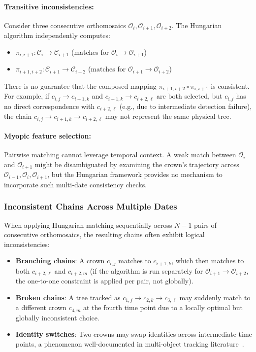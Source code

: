 \paragraph{Transitive inconsistencies:} Consider three consecutive orthomosaics $\mathcal{O}_i, \mathcal{O}_{i+1}, \mathcal{O}_{i+2}$. The Hungarian algorithm independently computes:
\begin{itemize}
    \item $\pi_{i,i+1}: \mathcal{C}_i \to \mathcal{C}_{i+1}$ (matches for $\mathcal{O}_i \to \mathcal{O}_{i+1}$)
    \item $\pi_{i+1,i+2}: \mathcal{C}_{i+1} \to \mathcal{C}_{i+2}$ (matches for $\mathcal{O}_{i+1} \to \mathcal{O}_{i+2}$)
\end{itemize}
There is no guarantee that the composed mapping $\pi_{i+1,i+2} \circ \pi_{i,i+1}$ is consistent. For example, if $c_{i,j} \to c_{i+1,k}$ and $c_{i+1,k} \to c_{i+2,\ell}$ are both selected, but $c_{i,j}$ has no direct correspondence with $c_{i+2,\ell}$ (e.g., due to intermediate detection failure), the chain $c_{i,j} \to c_{i+1,k} \to c_{i+2,\ell}$ may not represent the same physical tree.

\paragraph{Myopic feature selection:} Pairwise matching cannot leverage temporal context. A weak match between $\mathcal{O}_i$ and $\mathcal{O}_{i+1}$ might be disambiguated by examining the crown's trajectory across $\mathcal{O}_{i-1}, \mathcal{O}_i, \mathcal{O}_{i+1}$, but the Hungarian framework provides no mechanism to incorporate such multi-date consistency checks.

\subsubsection{Inconsistent Chains Across Multiple Dates}

When applying Hungarian matching sequentially across $N-1$ pairs of consecutive orthomosaics, the resulting chains often exhibit logical inconsistencies:
\begin{itemize}
    \item \textbf{Branching chains}: A crown $c_{i,j}$ matches to $c_{i+1,k}$, which then matches to both $c_{i+2,\ell}$ and $c_{i+2,m}$ (if the algorithm is run separately for $\mathcal{O}_{i+1} \to \mathcal{O}_{i+2}$, the one-to-one constraint is applied per pair, not globally).
    
    \item \textbf{Broken chains}: A tree tracked as $c_{1,j} \to c_{2,k} \to c_{3,\ell}$ may suddenly match to a different crown $c_{4,m}$ at the fourth time point due to a locally optimal but globally inconsistent choice.
    
    \item \textbf{Identity switches}: Two crowns may swap identities across intermediate time points, a phenomenon well-documented in multi-object tracking literature~\cite{leal2016motchallenge}.
\end{itemize}

